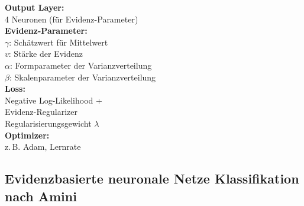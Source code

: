 \begin{center}
\begin{minipage}[t]{0.48\textwidth}
\textbf{Output Layer:} \\
4 Neuronen (für Evidenz-Parameter) \\[4pt]

\textbf{Evidenz-Parameter:} \\
$\gamma$: Schätzwert für Mittelwert \\
$v$: Stärke der Evidenz \\
$\alpha$: Formparameter der Varianzverteilung \\
$\beta$: Skalenparameter der Varianzverteilung \\[4pt]

\textbf{Loss:} \\
Negative Log-Likelihood + \\
Evidenz-Regularizer \\
Regularisierungsgewicht $\lambda$ \\[4pt]

\textbf{Optimizer:} \\
z.\,B. Adam, Lernrate
\end{minipage}
\end{center}

\newpage



\subsection*{\gls{Evidenzbasierte neuronale Netze} Klassifikation nach Amini \parencite{amini2020deep}}

\par\noindent\\

